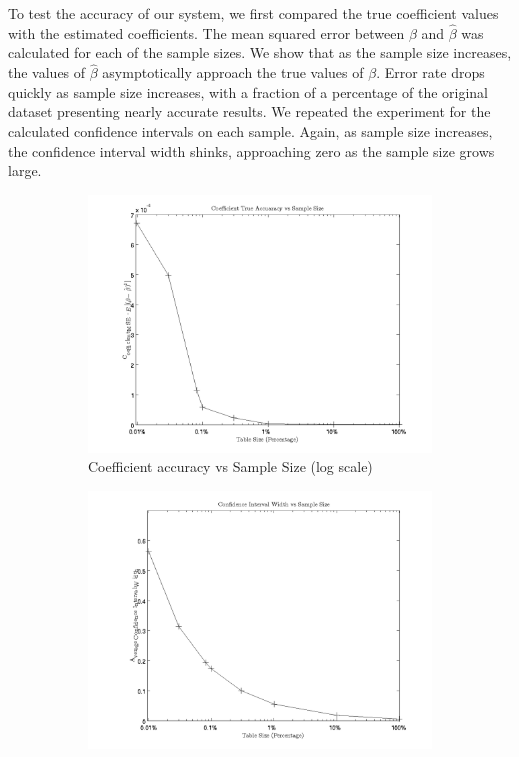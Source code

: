\documentclass[twoside]{article}
\begin{document}
To test the accuracy of our system, we first compared the true coefficient values with the estimated coefficients. The mean squared error between $\beta$ and $\hat \beta$ was calculated for each of the sample sizes. We show that as the sample size increases, the values of $\hat \beta$ asymptotically approach the true values of $\beta$. Error rate drops quickly as sample size increases, with a fraction of a percentage of the original dataset presenting nearly accurate results. We repeated the experiment for the calculated confidence intervals on each sample. Again, as sample size increases, the confidence interval width shinks, approaching zero as the sample size grows large.

\begin{figure}[htb]
        \centering
        \begin{subfigure}{0.45\textwidth}
                \includegraphics[width=\textwidth]{accuracy}
                \caption{Coefficient accuracy vs Sample Size (log scale)}
                \label{fig:accuracy}
        \end{subfigure}
        \begin{subfigure}{0.45\textwidth}
                \includegraphics[width=\textwidth]{confidence}

\end{subfigure}
\end{figure}
\end{document}
